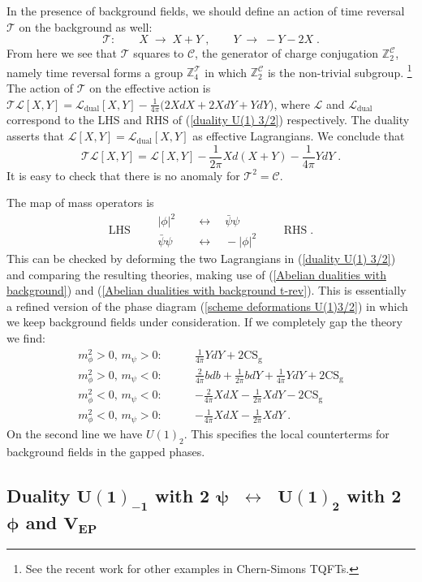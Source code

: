 \documentclass[a4paper, 12pt]{article}
\newcommand{\matht}[1]{\ensuremath{\boldsymbol{#1}}}
\numberwithin{equation}{section}
\newcommand{\be}{\begin{equation}} \newcommand{\ee}{\end{equation}}
\newcommand{\bea}{\begin{equation} \begin{aligned}} \newcommand{\eea}{\end{aligned} \end{equation}}
\newcommand{\cC}{\mathcal{C}}
\newcommand{\cL}{\mathcal{L}}
\newcommand{\cT}{\mathcal{T}}
\newcommand{\bZ}{\mathbb{Z}}
\begin{document}
In the presence of background fields, we should define an action of time reversal $\cT$ on the background as well:
\be
\cT:\qquad X \;\to\; X+Y \;,\qquad Y \;\to\; - Y - 2X \;.
\ee
From here we see that $\cT$ squares to $\cC$, the generator of charge conjugation $\bZ_2^\cC$, namely time reversal forms a group $\bZ_4^\cT$ in which $\bZ_2^\cC$ is the non-trivial subgroup.%
\footnote{See the recent work \cite{Barkeshli:2017rzd} for other examples in Chern-Simons TQFTs.}
The action of $\cT$ on the effective action is $\cT\cL[X,Y] = \cL_\text{dual}[X,Y] - \frac1{4\pi}\big( 2XdX + 2XdY + YdY \big)$, where $\cL$ and $\cL_\text{dual}$ correspond to the LHS and RHS of (\ref{duality U(1) 3/2}) respectively. The duality asserts that $\cL[X,Y] = \cL_\text{dual}[X,Y]$ as effective Lagrangians. We conclude that
\be
\cT\cL[X,Y] = \cL[X,Y] - \frac1{2\pi} Xd(X+Y) - \frac1{4\pi} YdY \;.
\ee
It is easy to check that there is no anomaly for $\cT^2 = \cC$.

The map of mass operators is
\be
\text{LHS} \qquad \begin{aligned}
|\phi|^2 &\quad\longleftrightarrow\quad \bar\psi\psi \\
\bar\psi\psi &\quad\longleftrightarrow\quad - |\phi|^2
\end{aligned} \qquad \text{RHS} \;.
\ee
This can be checked by deforming the two Lagrangians in (\ref{duality U(1) 3/2}) and comparing the resulting theories, making use of (\ref{Abelian dualities with background}) and (\ref{Abelian dualities with background t-rev}). This is essentially a refined version of the phase diagram (\ref{scheme deformations U(1)3/2}) in which we keep background fields under consideration. If we completely gap the theory we find:
\bea
m_\phi^2>0,\, m_\psi>0:\qquad& \frac1{4\pi} YdY + 2 \text{CS}_\text{g} \\
m_\phi^2>0,\, m_\psi<0:\qquad& \frac2{4\pi} bdb + \frac1{2\pi}bdY + \frac1{4\pi}YdY + 2 \text{CS}_\text{g} \\
m_\phi^2<0,\, m_\psi<0:\qquad& - \frac2{4\pi}XdX - \frac1{2\pi}XdY - 2 \text{CS}_\text{g} \\
m_\phi^2<0,\, m_\psi>0:\qquad& - \frac1{4\pi} XdX - \frac1{2\pi} XdY \;.
\eea
On the second line we have $U(1)_2$. This specifies the local counterterms for background fields in the gapped phases.




\subsection[Duality $U(1)_{-1}$ with 2 $\psi$ $\;\longleftrightarrow\;$ $U(1)_2$ with 2 $\phi$ and $V_\text{EP}$]{Duality \matht{U(1)_{-1}} with 2 \matht{\psi} \matht{\;\longleftrightarrow\;} \matht{U(1)_2} with 2 \matht{\phi} and \matht{V_\text{EP}}}
\label{sec: SO excluded}
\end{document}
